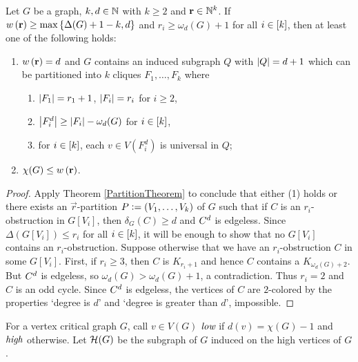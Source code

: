 	\begin{cor}\label{FirstColoringCorollary}
	Let $G$ be a graph, $k,d \in \mathbb{N}$ with $k \geq 2$ and $\mathbf{r} \in \mathbb{N}^k$.  If
	$w\left( \mathbf{r} \right) \geq \max\left\{ \Delta(G) + 1 - k, d \right\}$ and $r_i \geq \omega_d(G)
	+ 1$ for all $i \in \left[k\right]$, then at least one of the following holds:
			\begin{enumerate}
           \item $w\left( \mathbf{r} \right) = d$ and $G$ contains an induced subgraph $Q$ with $\left|Q\right| = d+1$ which can be partitioned into $k$ cliques $F_1, \ldots, F_k$ where 
					\begin{enumerate}
					\item $\left|F_1\right| = r_1 + 1$, $\left|F_i\right| = r_i$ for $i \geq 2$,
					\item $\left|F_i^d\right| \geq \left|F_i\right| - \omega_d(G)$ for $i \in \left[k\right]$,
					\item for $i \in \left[k\right]$, each $v \in V(F_i^d)$ is universal in $Q$;
					\end{enumerate}
			  \item $\chi(G) \leq w\left( \mathbf{r} \right)$. 
			\end{enumerate}
	\end{cor}
	\begin{proof}
		Apply Theorem \ref{PartitionTheorem} to conclude that either (1) holds or there exists an $\vec{r}$-partition $P \mathrel{\mathop:}= \left( V_1, \ldots, V_k \right)$ of 	
$G$ such that if $C$ is an $r_i$-obstruction in $G[V_i]$, then $\delta_G(C) \geq
d$ and $C^{d}$ is edgeless.  Since $\Delta(G[V_i]) \leq r_i$ for all $i
\in \left[k\right]$, it will be enough to show that no $G[V_i]$ contains an
$r_i$-obstruction.  Suppose otherwise that we have an $r_i$-obstruction $C$ in
some $G[V_i]$.  First, if $r_i \geq 3$, then $C$ is $K_{r_i + 1}$ and hence $C$
contains a $K_{\omega_d(G) + 2}$.  But $C^{d}$ is edgeless, so
$\omega_d(G) > \omega_d(G) + 1$, a contradiction.  Thus $r_i = 2$ and $C$ is an
odd cycle.  Since $C^{d}$ is edgeless, the vertices of $C$ are $2$-colored
by the properties `degree is $d$' and `degree is greater than $d$',
impossible.
	\end{proof}

	For a vertex critical graph $G$, call $v \in V(G)$	$\emph{low}$ if $d(v) = \chi(G) - 1$ and $\emph{high}$ otherwise. 
	Let $\mathcal{H}(G)$ be the subgraph of $G$ induced on the high vertices of $G$.
	
